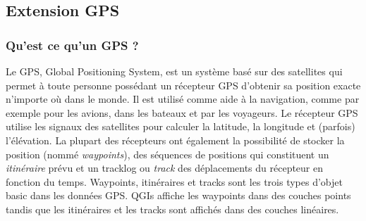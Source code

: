 
\subsection{Extension GPS}\label{label_plugingps}


\subsubsection{Qu'est ce qu'un GPS ?}\label{whatsgps}

Le GPS, Global Positioning System, est un syst\`eme bas\'e sur des satellites qui
permet \`a toute personne poss\'edant un r\'ecepteur GPS d'obtenir sa position exacte
n'importe o\`u dans le monde. Il est utilis\'e comme aide \`a la navigation, comme par
exemple pour les avions, dans les bateaux et par les voyageurs.
Le r\'ecepteur GPS utilise les signaux des satellites pour calculer la latitude,
la longitude et (parfois) l'\'el\'evation.
La plupart des r\'ecepteurs ont \'egalement la possibilit\'e de stocker la position
(nomm\'e \emph{waypoints}), des s\'equences de positions qui constituent un
\emph{itin\'eraire} pr\'evu et un tracklog ou \emph{track} des d\'eplacements du
r\'ecepteur en fonction du temps.
Waypoints, itin\'eraires et tracks sont les trois types d'objet basic dans les
donn\'ees GPS. QGIs affiche les waypoints dans des couches points tandis que les
itin\'eraires et les tracks sont affich\'es dans des couches lin\'eaires.

